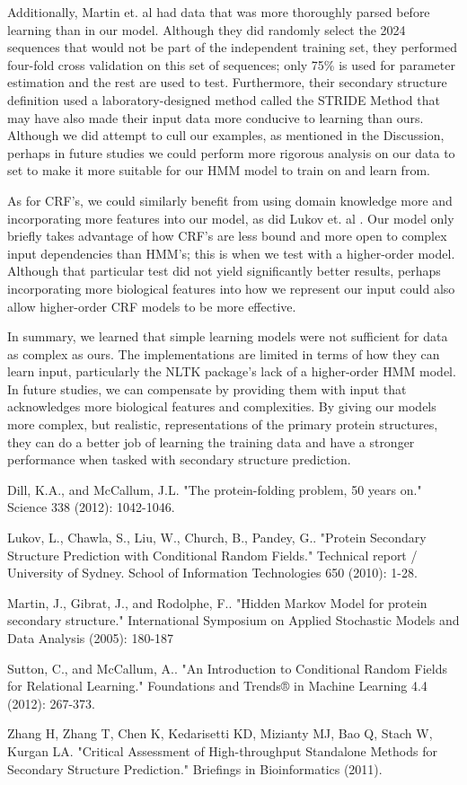 \documentclass[11 pt, twocolumn]{article}
\begin{document}
Additionally, Martin et. al had data that was more thoroughly parsed before learning than in our model. Although they did randomly select the 2024 sequences that would not be part of the independent training set, they performed four-fold cross validation on this set of sequences; only 75\% is used for parameter estimation and the rest are used to test. Furthermore, their secondary structure definition used a laboratory-designed method called the STRIDE Method that may have also made their input data more conducive to learning than ours\cite{Martin}. Although we did attempt to cull our examples, as mentioned in the Discussion, perhaps in future studies we could perform more rigorous analysis on our data to set to make it more suitable for our HMM model to train on and learn from.

As for CRF's, we could similarly benefit from using domain knowledge more and incorporating more features into our model, as did Lukov et. al \cite{Lukov}. Our model only briefly takes advantage of how CRF's are less bound and more open to complex input dependencies than HMM's; this is when we test with a higher-order model. Although that particular test did not yield significantly better results, perhaps incorporating more biological features into how we represent our input could also allow higher-order CRF models to be more effective.

In summary, we learned that simple learning models were not sufficient for data as complex as ours. The implementations are limited in terms of how they can learn input, particularly the NLTK package's lack of a higher-order HMM model. In future studies, we can compensate by providing them with input that acknowledges more biological features and complexities. By giving our models more complex, but realistic, representations of the primary protein structures, they can do a better job of learning the training data and have a stronger performance when tasked with secondary structure prediction.
\begin{thebibliography}{1}

Dill, K.A., and McCallum, J.L. "The protein-folding problem, 50 years on." Science 338 (2012): 1042-1046.

Lukov, L., Chawla, S., Liu, W., Church, B., Pandey, G.. "Protein Secondary Structure Prediction with
Conditional Random Fields." Technical report / University of Sydney. School of Information Technologies 650 (2010): 1-28.

Martin, J., Gibrat, J., and Rodolphe, F.. "Hidden Markov Model for protein secondary
structure." International Symposium on Applied Stochastic Models and Data Analysis (2005): 180-187

Sutton, C., and McCallum, A.. "An Introduction to Conditional Random Fields for Relational Learning." Foundations and Trends® in Machine Learning 4.4 (2012): 267-373.

Zhang H, Zhang T, Chen K, Kedarisetti KD, Mizianty MJ, Bao Q, Stach W, Kurgan LA. "Critical Assessment of High-throughput Standalone Methods for Secondary Structure Prediction." Briefings in Bioinformatics (2011).
\end{thebibliography}
\end{document}
